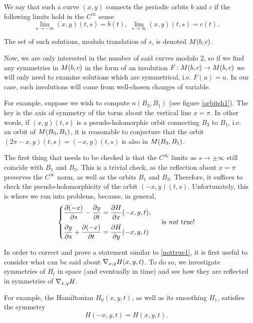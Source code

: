 We say that such a curve $(x,y)$ connects the periodic orbits $b$ and $c$ if the following limits hold in the $C^\infty$ sense
\begin{equation}
\lim_{s \to -\infty} (x,y)(t,s) = b(t), \; \lim_{s \to \infty} (x,y)(t,s) = c(t).
\end{equation}

The set of such solutions, modulo translation of $s$, is denoted $M(b,c)$.

Now, we are only interested in the number of said curves modulo 2, so if we find any symmetries in $M(b,c)$ in the form of an involution $F \colon M(b,c) \to M(b,c)$ we will only need to examine solutions which are symmetrical, i.e. $F(u) = u$. In our case, such involutions will come from well-chosen changes of variable.

For example, suppose we wish to compute $n(B_3, B_1)$ (see figure \ref{orbitsh1}). The key is the axis of symmetry of the torus about the vertical line $x = \pi$. In other words, if $(x,y)(t,s)$ is a pseudo-holomorphic orbit connecting $B_3$ to $B_1$, i.e. an orbit of $M(B_3,B_1)$, it is reasonable to conjecture that the orbit $(2\pi-x, y)(t,s) = (-x,y)(t,s)$ is also in $M(B_3,B_1)$.

The first thing that needs to be checked is that the $C^\infty$ limits as $s \to \pm \infty$ still coincide with $B_1$ and $B_3$. This is a trivial check, as the reflection about $x = \pi$ preserves the $C^\infty$ norm, as well as the orbits $B_1$ and $B_3$. Therefore, it suffices to check the pseudo-holomorphicity of the orbit $(-x,y)(t,s)$. Unfortunately, this is where we run into problems, because, in general,
\begin{equation}
\label{nottrue1}
\begin{cases}
\displaystyle \diffp{(-x)} s - \diffp y t = \diffp H x(-x,y,t),\\[1em]
\displaystyle \diffp y s + \diffp{(-x)} t = \diffp H y(-x,y,t)
\end{cases}
\text{ is \emph{not} true!}
\end{equation}

In order to correct and prove a statement similar to \eqref{nottrue1}, it is first useful to consider what can be said about $\nabla_{x,y} H(x,y,t)$. To do so, we investigate symmetries of $H_t$ in space (and eventually in time) and see how they are reflected in symmetries of $\nabla_{x,y} H$.

For example, the Hamiltonian $H_0(x,y,t)$, as well as its smoothing $H_1$, satisfies the symmetry
\begin{equation}
H(-x,y,t) = H(x,y,t).
\end{equation}


